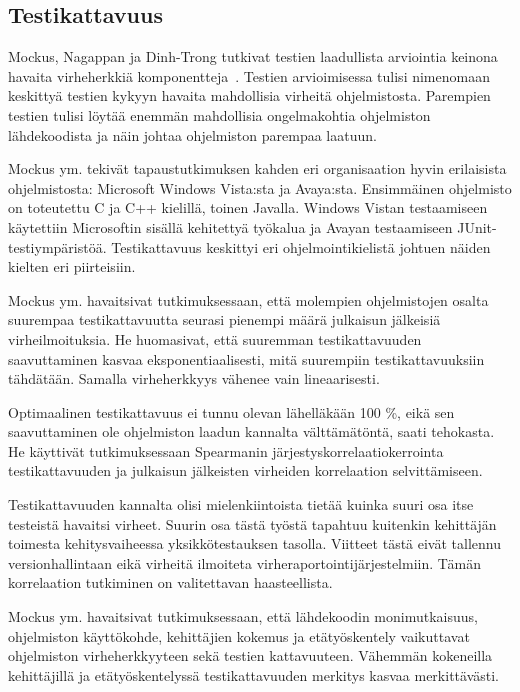 \documentclass[finnish]{../tktltiki2}
\theoremstyle{definition}
\theoremstyle{remark}
\begin{document}
\subsection{Testikattavuus}

Mockus, Nagappan ja Dinh-Trong tutkivat testien laadullista arviointia keinona havaita virheherkkiä 
komponentteja~\cite{MNDT09}. Testien arvioimisessa tulisi nimenomaan keskittyä testien kykyyn havaita mahdollisia 
virheitä ohjelmistosta. Parempien testien tulisi löytää enemmän mahdollisia ongelmakohtia ohjelmiston lähdekoodista ja 
näin johtaa ohjelmiston parempaa laatuun.

    Mockus ym. tekivät tapaustutkimuksen kahden eri organisaation hyvin erilaisista ohjelmistosta: Microsoft Windows 
Vista:sta ja Avaya:sta. Ensimmäinen ohjelmisto on toteutettu C ja C++ kielillä, toinen Javalla. Windows Vistan 
testaamiseen käytettiin Microsoftin sisällä kehitettyä työkalua ja Avayan testaamiseen JUnit-testiympäristöä. 
Testikattavuus keskittyi eri ohjelmointikielistä johtuen näiden kielten eri piirteisiin.

    Mockus ym. havaitsivat tutkimuksessaan, että molempien ohjelmistojen osalta suurempaa testikattavuutta seurasi 
pienempi määrä julkaisun jälkeisiä virheilmoituksia. He huomasivat, että suuremman testikattavuuden saavuttaminen kasvaa 
eksponentiaalisesti, mitä suurempiin testikattavuuksiin tähdätään. Samalla virheherkkyys vähenee vain lineaarisesti. 

    Optimaalinen testikattavuus ei tunnu olevan lähelläkään 100 \%, eikä sen saavuttaminen ole ohjelmiston laadun 
kannalta välttämätöntä, saati tehokasta. He käyttivät tutkimuksessaan Spearmanin järjestyskorrelaatiokerrointa 
testikattavuuden ja julkaisun jälkeisten virheiden korrelaation selvittämiseen.

    Testikattavuuden kannalta olisi mielenkiintoista tietää kuinka suuri osa itse testeistä havaitsi virheet. Suurin osa 
tästä työstä tapahtuu kuitenkin kehittäjän toimesta kehitysvaiheessa yksikkötestauksen tasolla. Viitteet tästä eivät 
tallennu versionhallintaan eikä virheitä ilmoiteta virheraportointijärjestelmiin. Tämän korrelaation tutkiminen on 
valitettavan haasteellista.

    Mockus ym. havaitsivat tutkimuksessaan, että lähdekoodin monimutkaisuus, ohjelmiston käyttökohde, kehittäjien 
kokemus ja etätyöskentely vaikuttavat ohjelmiston virheherkkyyteen sekä testien kattavuuteen. Vähemmän kokeneilla 
kehittäjillä ja etätyöskentelyssä testikattavuuden merkitys kasvaa merkittävästi. 
\end{document}
